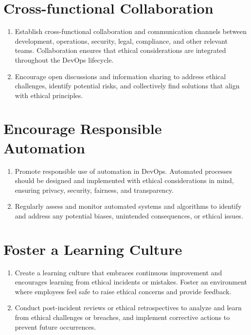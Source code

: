 \section*{Cross-functional Collaboration}
        \begin{enumerate}
            \item Establish cross-functional collaboration and communication channels between development, operations, security, legal, compliance, and other relevant teams. Collaboration ensures that ethical considerations are integrated throughout the DevOps lifecycle.
            
            \item Encourage open discussions and information sharing to address ethical challenges, identify potential risks, and collectively find solutions that align with ethical principles.
        \end{enumerate}

\section*{Encourage Responsible Automation}
        \begin{enumerate}
            \item Promote responsible use of automation in DevOps. Automated processes should be designed and implemented with ethical considerations in mind, ensuring privacy, security, fairness, and transparency.
    
            \item Regularly assess and monitor automated systems and algorithms to identify and address any potential biases, unintended consequences, or ethical issues.
        \end{enumerate}

\section*{Foster a Learning Culture}
        \begin{enumerate}
            \item Create a learning culture that embraces continuous improvement and encourages learning from ethical incidents or mistakes. Foster an environment where employees feel safe to raise ethical concerns and provide feedback.
    
            \item Conduct post-incident reviews or ethical retrospectives to analyze and learn from ethical challenges or breaches, and implement corrective actions to prevent future occurrences.
        \end{enumerate}

